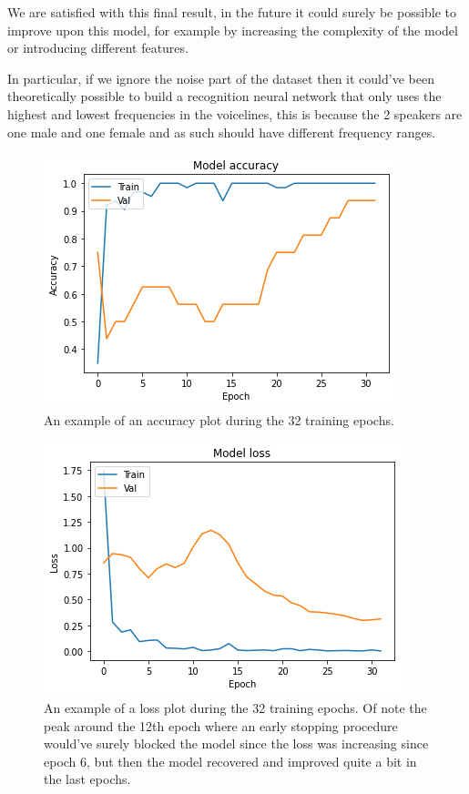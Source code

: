 \documentclass{article}
\begin{document}
	\bigskip
	We are satisfied with this final result, in the future it could surely be possible to improve upon this model, for example by increasing 
	the complexity of the model or introducing different features.

	In particular, if we ignore the noise part of the dataset then it could've been theoretically possible to build a recognition neural network that only uses the
	highest and lowest frequencies in the voicelines, this is because the 2 speakers are one male and one female and as such should have different frequency
	ranges.

	\begin{figure}
	\centering
	\includegraphics[width = \textwidth]{acc}
	\caption{An example of an accuracy plot during the 32 training epochs.}
	\label{fig:acc}
	\end{figure}

	\begin{figure}
	\centering
	\includegraphics[width = \textwidth]{loss}
	\caption{An example of a loss plot during the 32 training epochs. Of note the peak around the 12th epoch where an early stopping procedure would've 
		     surely blocked the model since the loss was increasing since epoch 6, but then the model recovered and improved quite a bit in the last epochs.}
	\end{figure}
\end{document}
